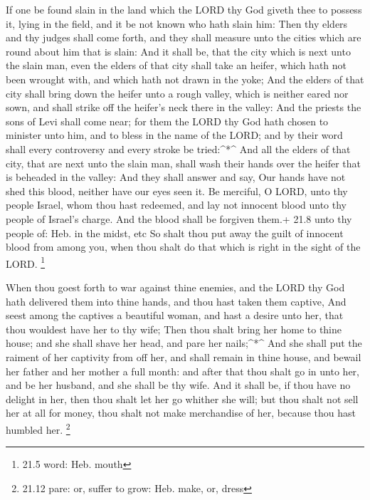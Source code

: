  If one be found slain in the land which the LORD thy God
giveth thee to possess it, lying in the field, and it be not known who
hath slain him:  Then thy elders and thy judges shall come
forth, and they shall measure unto the cities which are round about him
that is slain:  And it shall be, that the city which is next
unto the slain man, even the elders of that city shall take an heifer,
which hath not been wrought with, and which hath not drawn in the yoke;
 And the elders of that city shall bring down the heifer
unto a rough valley, which is neither eared nor sown, and shall strike
off the heifer's neck there in the valley:  And the priests
the sons of Levi shall come near; for them the LORD thy God hath chosen
to minister unto him, and to bless in the name of the LORD; and by their
word shall every controversy and every stroke be tried:\^{}*\^{}
 And all the elders of that city, that are next unto the
slain man, shall wash their hands over the heifer that is beheaded in
the valley:  And they shall answer and say, Our hands have
not shed this blood, neither have our eyes seen it.  Be
merciful, O LORD, unto thy people Israel, whom thou hast redeemed, and
lay not innocent blood unto thy people of Israel's charge. And the blood
shall be forgiven them.+ 21.8 unto thy people of: Heb. in the midst, etc
 So shalt thou put away the guilt of innocent blood from
among you, when thou shalt do that which is right in the sight of the
LORD. \footnote{21.5 word: Heb. mouth}

 When thou goest forth to war against thine enemies, and
the LORD thy God hath delivered them into thine hands, and thou hast
taken them captive,  And seest among the captives a
beautiful woman, and hast a desire unto her, that thou wouldest have her
to thy wife;  Then thou shalt bring her home to thine
house; and she shall shave her head, and pare her nails;\^{}*\^{}
 And she shall put the raiment of her captivity from off
her, and shall remain in thine house, and bewail her father and her
mother a full month: and after that thou shalt go in unto her, and be
her husband, and she shall be thy wife.  And it shall be,
if thou have no delight in her, then thou shalt let her go whither she
will; but thou shalt not sell her at all for money, thou shalt not make
merchandise of her, because thou hast humbled her. \footnote{21.12 pare:
  or, suffer to grow: Heb. make, or, dress}

